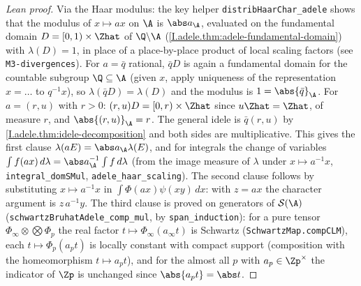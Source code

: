 \begin{proof}[Lean proof]
Via the Haar modulus: the key helper \texttt{distribHaarChar\_adele} shows that the modulus of $x\mapsto ax$ on $\A$ is $\abs a_\A$, evaluated on the fundamental domain $D=[0,1)\times\Zhat$ of $\Q\backslash\A$ (\cref{I.adele.thm:adele-fundamental-domain}) with $\lambda(D)=1$, in place of a place-by-place product of local scaling factors (see \texttt{M3-divergences}). For $a=\bar q$ rational, $\bar q D$ is again a fundamental domain for the countable subgroup $\Q\subseteq\A$ (given $x$, apply uniqueness of the representation $x=\ldots$ to $q^{-1}x$), so $\lambda(\bar q D)=\lambda(D)$ and the modulus is $1=\abs{\bar q}_\A$. For $a=(r,u)$ with $r>0$: $(r,u)D=[0,r)\times\Zhat$ since $u\Zhat=\Zhat$, of measure $r$, and $\abs{(r,u)}_\A=r$. The general idele is $\bar q(r,u)$ by \cref{I.adele.thm:idele-decomposition} and both sides are multiplicative. This gives the first clause $\lambda(aE)=\abs a_\A\lambda(E)$, and for integrals the change of variables $\int f(ax)\,d\lambda=\abs a_\A^{-1}\int f\,d\lambda$ (from the image measure of $\lambda$ under $x\mapsto a^{-1}x$, \texttt{integral\_domSMul}, \texttt{adele\_haar\_scaling}). The second clause follows by substituting $x\mapsto a^{-1}x$ in $\int\Phi(ax)\psi(xy)\,dx$: with $z=ax$ the character argument is $z\,a^{-1}y$. The third clause is proved on generators of $\mathcal S(\A)$ (\texttt{schwartzBruhatAdele\_comp\_mul}, by \texttt{span\_induction}): for a pure tensor $\Phi_\infty\otimes\bigotimes\Phi_p$ the real factor $t\mapsto\Phi_\infty(a_\infty t)$ is Schwartz (\texttt{SchwartzMap.compCLM}), each $t\mapsto\Phi_p(a_pt)$ is locally constant with compact support (composition with the homeomorphism $t\mapsto a_pt$), and for the almost all $p$ with $a_p\in\Zp^\times$ the indicator of $\Zp$ is unchanged since $\abs{a_pt}=\abs t$.
\end{proof}

